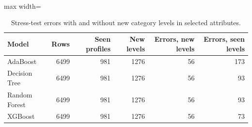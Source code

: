 \begin{table}[H]
\centering\small
\caption{Stress-test errors with and without new category levels in selected attributes.}
\begin{adjustbox}{max width=\linewidth}\begin{tabular}{lrrrrr}
\toprule
Model & Rows & Seen profiles & New levels & Errors, new levels & Errors, seen levels \\
\midrule
AdaBoost & 6499 & 981 & 1276 & 56 & 173 \\
Decision Tree & 6499 & 981 & 1276 & 56 & 93 \\
Random Forest & 6499 & 981 & 1276 & 56 & 93 \\
XGBoost & 6499 & 981 & 1276 & 56 & 73 \\
\bottomrule
\end{tabular}\end{adjustbox}
\end{table}
